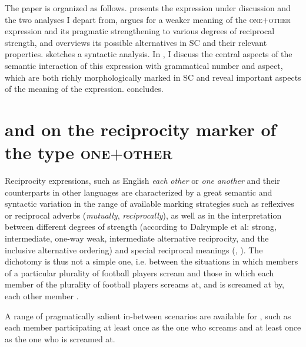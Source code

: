 \documentclass[output=paper,colorlinks,citecolor=brown]{langscibook}
\begin{document}
The paper is organized as follows.  presents the expression under discussion and the two analyses I depart from,  argues for a weaker meaning of the \textsc{one$+$other} expression and its pragmatic strengthening to various degrees of reciprocal strength, and  overviews its possible alternatives in SC and their relevant properties.  sketches a syntactic analysis. In , I discuss the central aspects of the semantic interaction of this expression with grammatical number and aspect, which are both richly morphologically marked in SC and reveal important aspects of the meaning of the expression.  concludes.


\section{\citet{v10} and \citet{z14} on the reciprocity marker of the type \textsc{one$+$other}}\label{sec:arsenijevic:2}

Reciprocity expressions, such as English \textit{each} \textit{other} or \textit{one} \textit{another} and their counterparts in other languages are characterized by a great semantic and syntactic variation in the range of available marking strategies such as reflexives or reciprocal adverbs (\textit{mutually}, \textit{reciprocally}), as well as in the interpretation between different degrees of strength (according to Dalrymple et al: strong, intermediate, one-way weak, intermediate alternative reciprocity, and the inclusive alternative ordering) and special reciprocal meanings (\citealt{dkmp94}, \citealt{n07}). The dichotomy is thus not a simple one, i.e. between the situations in which members of a particular plurality of football players scream   and those in which each member of the plurality of football players screams at, and is screamed at by, each other member .

\ea\label{ex:arsenijevic:Football}
\label{ex:arsenijevic:Football-a}
\label{ex:arsenijevic:Football-b}
\z\z

\noindent A range of pragmatically salient in-between scenarios are available for , such as each member participating at least once as the one who screams and at least once as the one who is screamed at.
\end{document}

